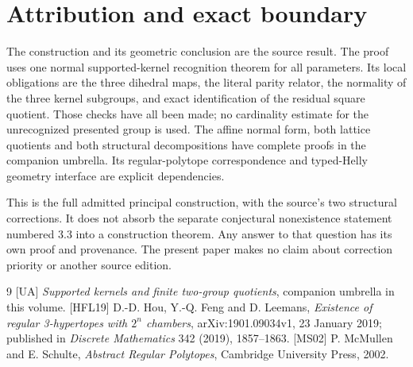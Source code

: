 \section{Attribution and exact boundary}
The construction and its geometric conclusion are the source result.
The proof uses one normal supported-kernel recognition theorem for all
parameters. Its local obligations are the three dihedral maps, the literal
parity relator, the normality of the three kernel subgroups, and exact
identification of the residual square quotient. Those checks have all been
made; no cardinality estimate for the unrecognized presented group is used.
The affine normal form, both lattice quotients and both structural
decompositions have complete proofs in the companion umbrella. Its
regular-polytope correspondence and typed-Helly geometry interface are
explicit dependencies.

This is the full admitted principal construction, with the source's two
structural corrections. It does not absorb the separate conjectural
nonexistence statement numbered 3.3 into a construction theorem. Any answer
to that question has its own proof and provenance. The present paper makes
no claim about correction priority or another source edition.

\begin{thebibliography}{9}
[UA] \emph{Supported kernels and finite two-group quotients},
companion umbrella in this volume.
[HFL19] D.-D. Hou, Y.-Q. Feng and D. Leemans,
\emph{Existence of regular 3-hypertopes with $2^n$ chambers},
arXiv:1901.09034v1, 23 January 2019; published in
\emph{Discrete Mathematics} 342 (2019), 1857--1863.
[MS02] P. McMullen and E. Schulte,
\emph{Abstract Regular Polytopes}, Cambridge University Press, 2002.
\end{thebibliography}

